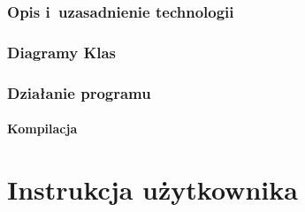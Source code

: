 \documentclass[a4paper]{scrartcl}
\let\stdpart\part
\renewcommand\part{\newpage\stdpart}
\begin{document}
\section{Opis i~uzasadnienie technologii}

\section{Diagramy Klas}

\section{Działanie programu}
\subsection{Kompilacja}


\part{Instrukcja użytkownika}


\end{document}

